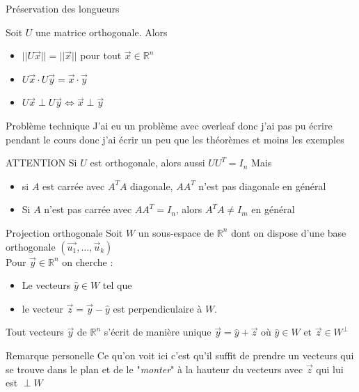 \begin{parag}{Préservation des longueurs}
    \begin{theoreme}
        Soit $U$ une matrice orthogonale. Alors
        \begin{itemize}
            \item $||U\vec{x}|| = ||\vec{x}||$ pour tout $\vec{x} \in \mathbb{R}^n$
            \item $U\vec{x}\cdot U\vec{y} = \vec{x}\cdot \vec{y}$
            \item $U\vec{x} \perp U\vec{y} \Leftrightarrow \vec{x}\perp \vec{y}$
        \end{itemize}
    \end{theoreme}
    \begin{subparag}{Problème technique}
        J'ai eu un problème avec overleaf donc j'ai pas pu écrire pendant le cours donc j'ai écrir un peu que les théorèmes et moins les exemples
    \end{subparag}
\end{parag}

\begin{parag}{ATTENTION}
    Si $U$ est orthogonale, alors aussi $UU^T = I_n$ Mais
    \begin{itemize}
        \item si $A$ est carrée avec $A^TA$ diagonale, $AA^T$ n'est pas diagonale en général
        \item Si $A$ n'est pas carrée avec $AA^T = I_n$, alors $A^TA \neq I_m$ en général
    \end{itemize}
\end{parag}
\begin{parag}{Projection orthogonale}
    Soit $W$ un sous-espace de $\mathbb{R}^n$ dont on dispose d'une base orthogonale $(\vec{u_1}, \dots, \vec{u}_k)$\\
    Pour $\vec{y} \in \mathbb{R}^n$ on cherche :
    \begin{itemize}
        \item Le vecteurs $\hat{y}\in W$ tel que
        \item le vecteur $\vec{z} = \vec{y}-\hat{y}$ est perpendiculaire à $W$.
    \end{itemize}
    \begin{theoreme}
        Tout vecteurs $\vec{y}$ de $\mathbb{R}^n$ s'écrit de manière unique $\vec{y} = \hat{y}+\vec{z}$ où $\hat{y}\in W$ et $\vec{z}\in W^\perp$
    \end{theoreme}
    \begin{subparag}{Remarque personelle}
        Ce qu'on voit ici c'est qu'il suffit de prendre un vecteurs qui se trouve dans le plan et de le "\textit{monter}" à la hauteur du vecteurs avec $\vec{z}$ qui lui est $\perp W$
    \end{subparag}
\end{parag}

